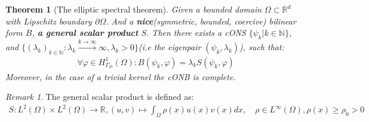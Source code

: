 \documentclass[a4paper,11pt,oneside,fleqn]{book}
\newtheorem{theorem}{Theorem}[section]
\theoremstyle{definition}
\theoremstyle{remark}
\newtheorem*{remark}{Remark}
\begin{document}
\begin{theorem}[The elliptic spectral theorem]
	Given a bounded domain $\Omega \subset \mathbb{R}^d$ with Lipschitz boundary $\partial \Omega$. And a \textbf{nice}(symmetric, bounded, coercive) bilinear form $B$, \textbf{a general scalar product} $S$. Then there exists a cONS $\{\psi_k | k \in \mathbb{N}\}$, and $\{(\lambda_k)_{k \in \mathbb{N}}: \lambda_k \overset{ k \rightarrow \infty}{\rightarrow} \infty, \lambda_k > 0 \}$(i.e the eigenpair $(\psi_k, \lambda_k)$), such that:
\begin{align*}
		\forall \varphi \in H^1_{\Gamma_D}(\Omega): B(\psi_k, \varphi) =\lambda_k S(\psi_k, \varphi) 
\end{align*}
Moreover, in the case of a trivial kernel the cONB is complete. 
\end{theorem}
\begin{remark}
The general scalar product is defined as:
\begin{align*}
	S: L^2(\Omega) \times L^2(\Omega) \rightarrow \mathbb{R}, 
	(u, v) \mapsto \int_\Omega \rho(x)u(x)v(x)dx , \quad \rho \in L^\infty(\Omega), \rho(x) \geq \rho_0 > 0
\end{align*}	
\end{remark}
\end{document}

